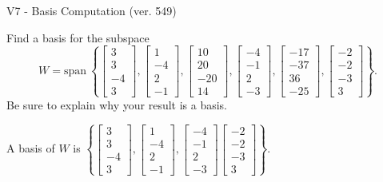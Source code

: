 \begin{exercise}
  \begin{exerciseTitle}V7 - Basis Computation (ver. 549)\end{exerciseTitle}
  \begin{exerciseStatement}
    Find a basis for the subspace 
\[W=\mathrm{span}\ \left\{\left[\begin{array}{r}
3 \\
3 \\
-4 \\
3
\end{array}\right] , \left[\begin{array}{r}
1 \\
-4 \\
2 \\
-1
\end{array}\right] , \left[\begin{array}{r}
10 \\
20 \\
-20 \\
14
\end{array}\right] , \left[\begin{array}{r}
-4 \\
-1 \\
2 \\
-3
\end{array}\right] , \left[\begin{array}{r}
-17 \\
-37 \\
36 \\
-25
\end{array}\right] , \left[\begin{array}{r}
-2 \\
-2 \\
-3 \\
3
\end{array}\right]\right\}.\]
 Be sure to explain why your result is a basis.


  \end{exerciseStatement}
  \begin{exerciseAnswer}
   A basis of \(W\) is  \(\left\{\left[\begin{array}{r}
3 \\
3 \\
-4 \\
3
\end{array}\right] , \left[\begin{array}{r}
1 \\
-4 \\
2 \\
-1
\end{array}\right] , \left[\begin{array}{r}
-4 \\
-1 \\
2 \\
-3
\end{array}\right] \left[\begin{array}{r}
-2 \\
-2 \\
-3 \\
3
\end{array}\right]\right\}\).
  


  \end{exerciseAnswer}
\end{exercise}